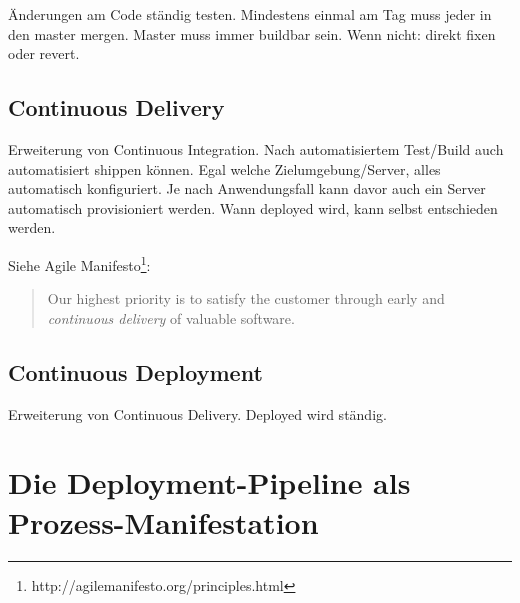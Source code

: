 Änderungen am Code ständig testen. Mindestens einmal am Tag muss jeder in den master mergen. Master muss immer buildbar sein. Wenn nicht: direkt fixen oder revert.

\subsection{Continuous Delivery}

Erweiterung von Continuous Integration. Nach automatisiertem Test/Build auch automatisiert shippen können. Egal welche Zielumgebung/Server, alles automatisch konfiguriert. Je nach Anwendungsfall kann davor auch ein Server automatisch provisioniert werden. Wann deployed wird, kann selbst entschieden werden.

Siehe Agile Manifesto\footnote{http://agilemanifesto.org/principles.html}:

\begin{quote}
  Our highest priority is to satisfy the customer through early and \emph{continuous delivery} of valuable software.
\end{quote}


\subsection{Continuous Deployment}

Erweiterung von Continuous Delivery. Deployed wird ständig.


\section{Die Deployment-Pipeline als Prozess-Manifestation}
